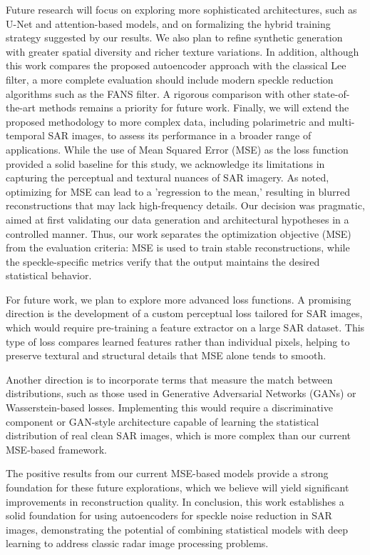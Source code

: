 Future research will focus on exploring more sophisticated architectures, such as U-Net and attention-based models, and on formalizing the hybrid training strategy suggested by our results.%
 We also plan to refine synthetic generation with greater spatial diversity and richer texture variations. In addition, although this work compares the proposed autoencoder approach with the classical Lee filter, a more complete evaluation should include modern speckle reduction algorithms such as the FANS filter. A rigorous comparison with other state-of-the-art methods remains a priority for future work. Finally, we will extend the proposed methodology to more complex data, including polarimetric and multi-temporal SAR images, to assess its performance in a broader range of applications. While the use of Mean Squared Error (MSE) as the loss function provided a solid baseline for this study, we acknowledge its limitations in capturing the perceptual and textural nuances of SAR imagery. As noted, optimizing for MSE can lead to a 'regression to the mean,' resulting in blurred reconstructions that may lack high-frequency details. Our decision was pragmatic, aimed at first validating our data generation and architectural hypotheses in a controlled manner. Thus, our work separates the optimization objective (MSE) from the evaluation criteria: MSE is used to train stable reconstructions, while the speckle-specific metrics verify that the output maintains the desired statistical behavior.

For future work, we plan to explore more advanced loss functions. A promising direction is the development of a custom perceptual loss tailored for SAR images, which would require pre-training a feature extractor on a large SAR dataset. This type of loss compares learned features rather than individual pixels, helping to preserve textural and structural details that MSE alone tends to smooth.

Another direction is to incorporate terms that measure the match between distributions, such as those used in Generative Adversarial Networks (GANs) or Wasserstein-based losses. Implementing this would require a discriminative component or GAN-style architecture capable of learning the statistical distribution of real clean SAR images, which is more complex than our current MSE-based framework.

The positive results from our current MSE-based models provide a strong foundation for these future explorations, which we believe will yield significant improvements in reconstruction quality.
In conclusion, this work establishes a solid foundation for using autoencoders for speckle noise reduction in SAR images, demonstrating the potential of combining statistical models with deep learning to address classic radar image processing problems.